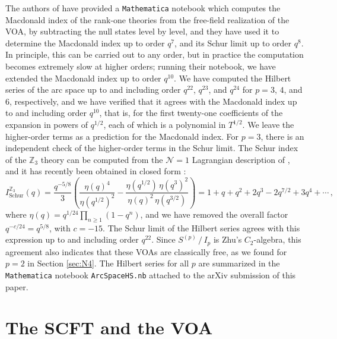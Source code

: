 \documentclass[12pt]{article}
\numberwithin{equation}{section}
\numberwithin{figure}{section}
\theoremstyle{plain}
\theoremstyle{definition}
\begin{document}
The authors of \cite{Agarwal:2021oyl} have provided a {\tt Mathematica} notebook which computes the Macdonald index of the rank-one theories from the free-field realization of the VOA, by subtracting the null states level by level, and they have used it to determine the Macdonald index up to order $q^7$, and its Schur limit up to order $q^8$. In principle, this can be carried out to any order, but in practice the computation becomes extremely slow at higher orders; running their notebook, we have extended the Macdonald index up to order $q^{10}$. We have computed the Hilbert series of the arc space up to and including order $q^{22}$, $q^{23}$, and $q^{24}$ for $p = 3$, $4$, and $6$, respectively, and we have verified that it agrees with the Macdonald index up to and including order $q^{10}$, that is, for the first twenty-one coefficients of the expansion in powers of $q^{1/2}$, each of which is a polynomial in $T^{1/2}$. We leave the higher-order terms as a prediction for the Macdonald index. For $p = 3$, there is an independent check of the higher-order terms in the Schur limit. The Schur index of the $\mathbb{Z}_3$ theory can be computed from the $\mathcal{N}=1$ Lagrangian description of \cite{Zafrir:2020epd}, and it has recently been obtained in closed form \cite{Guo:2026lsl}:
\begin{equation}
    I_\text{Schur}^{\mathbb{Z}_3}(q) = \frac{q^{-5/8}}{3} \left( \frac{\eta(q)^4}{\eta(q^{1/2})^2} - \frac{\eta(q^{1/2}) \, \eta(q^3)^2}{\eta(q)^2 \, \eta(q^{3/2})} \right) = 1 + q + q^2 + 2q^3 - 2q^{7/2} + 3q^4 + \cdots \,,
\end{equation}
where $\eta(q) = q^{1/24} \prod_{n \geq 1} (1 - q^n)$, and we have removed the overall factor $q^{-c/24} = q^{5/8}$, with $c = -15$. The Schur limit of the Hilbert series agrees with this expression up to and including order $q^{22}$. Since $S^{(p)} \, / \, I_p$ is Zhu's $C_2$-algebra, this agreement also indicates that these VOAs are classically free, as we found for $p = 2$ in Section \ref{sec:N4}. The Hilbert series for all $p$ are summarized in the {\tt Mathematica} notebook {\tt ArcSpaceHS.nb} attached to the arXiv submission of this paper.

\section{The \texorpdfstring{}{E6(SU(2))} SCFT and the \texorpdfstring{}{A(6)} VOA}\label{sec:A6}
\end{document}
